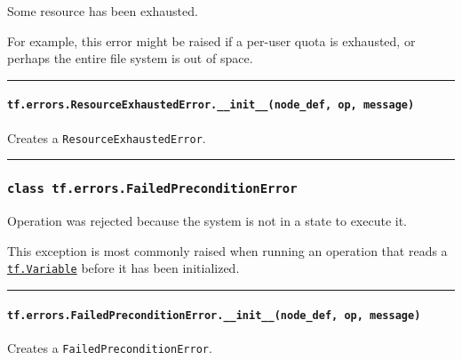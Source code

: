 Some resource has been exhausted.

For example, this error might be raised if a per-user quota is
exhausted, or perhaps the entire file system is out of space.

\begin{center}\rule{0.5\linewidth}{\linethickness}\end{center}

\paragraph{\texorpdfstring{\texttt{tf.errors.ResourceExhaustedError.\_\_init\_\_(node\_def,\ op,\ message)}
}{tf.errors.ResourceExhaustedError.\_\_init\_\_(node\_def, op, message) }}\label{tf.errors.resourceexhaustederror.ux5fux5finitux5fux5fnodeux5fdef-op-message}

Creates a \texttt{ResourceExhaustedError}.

\begin{center}\rule{0.5\linewidth}{\linethickness}\end{center}

\subsubsection{\texorpdfstring{\texttt{class\ tf.errors.FailedPreconditionError}
}{class tf.errors.FailedPreconditionError }}\label{class-tf.errors.failedpreconditionerror}

Operation was rejected because the system is not in a state to execute
it.

This exception is most commonly raised when running an operation that
reads a
\href{../../api_docs/python/state_ops.md\#Variable}{\texttt{tf.Variable}}
before it has been initialized.

\begin{center}\rule{0.5\linewidth}{\linethickness}\end{center}

\paragraph{\texorpdfstring{\texttt{tf.errors.FailedPreconditionError.\_\_init\_\_(node\_def,\ op,\ message)}
}{tf.errors.FailedPreconditionError.\_\_init\_\_(node\_def, op, message) }}\label{tf.errors.failedpreconditionerror.ux5fux5finitux5fux5fnodeux5fdef-op-message}

Creates a \texttt{FailedPreconditionError}.

